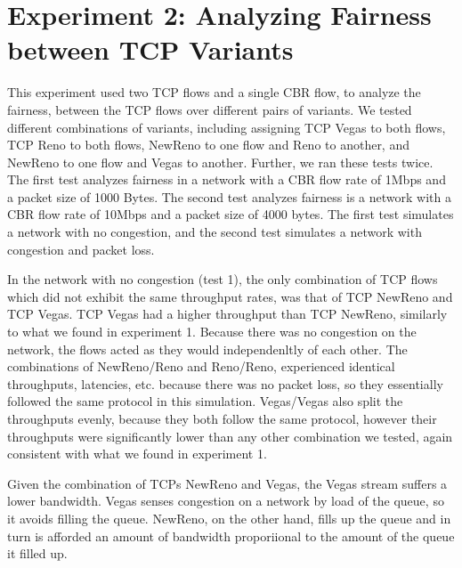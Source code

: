 \section{Experiment 2: Analyzing Fairness between TCP Variants}

This experiment used two TCP flows and a single CBR flow, to analyze the fairness, between the TCP flows over different pairs of variants. We tested different combinations of variants, including assigning TCP Vegas to both flows, TCP Reno to both flows, NewReno to one flow and Reno to another, and NewReno to one flow and Vegas to another. Further, we ran these tests twice. The first test analyzes fairness in a network with a CBR flow rate of 1Mbps and a packet size of 1000 Bytes. The second test analyzes fairness is a network with a CBR flow rate of 10Mbps and a packet size of 4000 bytes. The first test simulates a network with no congestion, and the second test simulates a network with congestion and packet loss.

In the network with no congestion (test 1), the only combination of TCP flows which did not exhibit the same throughput rates, was that of TCP NewReno and TCP Vegas. TCP Vegas had a higher throughput than TCP NewReno, similarly to what we found in experiment 1. Because there was no congestion on the network, the flows acted as they would independenltly of each other. The combinations of NewReno/Reno and Reno/Reno, experienced identical throughputs, latencies, etc. because there was no packet loss, so they essentially followed the same protocol in this simulation. Vegas/Vegas also split the throughputs evenly, because they both follow the same protocol, however their throughputs were significantly lower than any other combination we tested, again consistent with what we found in experiment 1.

Given the combination of TCPs NewReno and Vegas, the Vegas stream suffers a lower bandwidth. Vegas senses congestion on a network by load of the queue, so it avoids filling the queue. NewReno, on the other hand, fills up the queue and in turn is afforded an amount of bandwidth proporiional to the amount of the queue it filled up.

